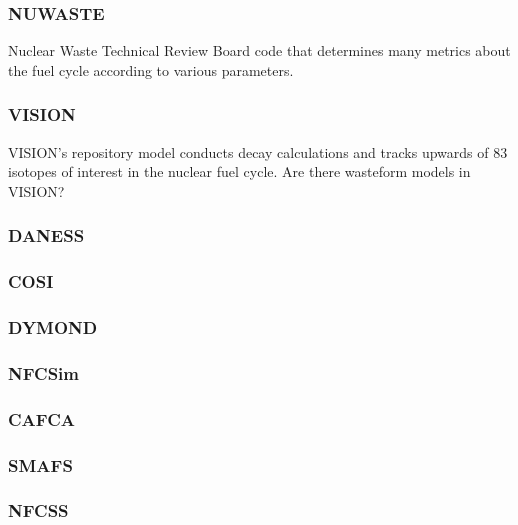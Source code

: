 \subsubsection{NUWASTE} Nuclear Waste Technical Review Board code that 
determines many metrics about the fuel cycle according to various 
parameters. \cite{NuwastePres} 

\subsubsection{VISION}
VISION's repository model conducts decay calculations and tracks 
upwards of 83 isotopes of interest in the nuclear fuel cycle. 
\cite{VISION} Are there wasteform models in VISION?
\subsubsection{DANESS}
\subsubsection{COSI}
\subsubsection{DYMOND}
\subsubsection{NFCSim}
\subsubsection{CAFCA}
\subsubsection{SMAFS}
\subsubsection{NFCSS}
